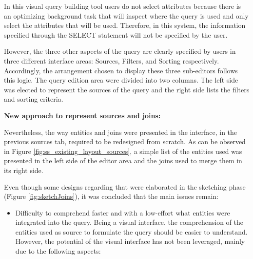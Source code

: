 In this visual query building tool users do not select attributes because there is an optimizing background task that will inspect where the query is used and only select the attributes that will be used. Therefore, in this system, the information specified through the SELECT statement will not be specified by the user.

However, the three other aspects of the query are clearly specified by users in three different interface areas: Sources, Filters, and Sorting respectively. Accordingly, the arrangement chosen to display these three sub-editors follows this logic. The query edition area were divided into two columns. The left side was elected to represent the sources of the query and the right side lists the filters and sorting criteria.

\medskip

\textbf{New approach to represent sources and joins:}

\medskip

Nevertheless, the way entities and joins were presented in the interface, in the previous sources tab, required to be redesigned from scratch. As can be observed in Figure \ref{fig:ss_existing_layout_sources}, a simple list of the entities used was presented in the left side of the editor area and the joins used to merge them in its right side.

Even though some designs regarding that were elaborated in the sketching phase (Figure \ref{fig:sketchJoins}), it was concluded that the main issues remain:

\begin{itemize}
  \item Difficulty to comprehend faster and with a low-effort what entities were integrated into the query. Being a visual interface, the comprehension of the entities used as source to formulate the query should be easier to understand. However, the potential of the visual interface has not been leveraged, mainly due to the following aspects:
\end{itemize}

